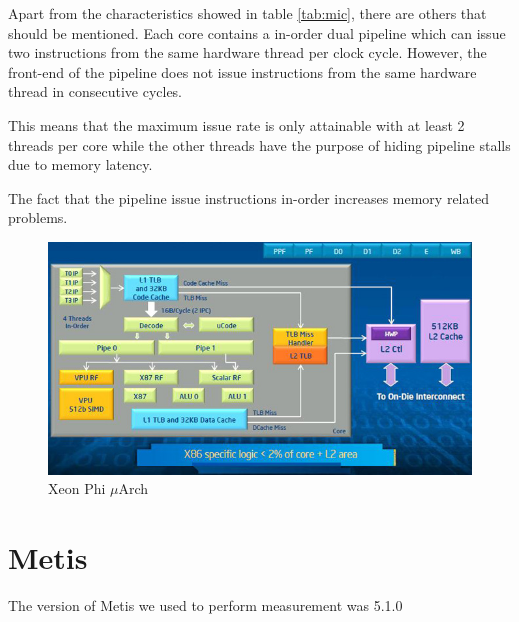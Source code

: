 \documentclass[abstract=on,9pt,twocolumn]{scrartcl}
\begin{document}
Apart from the characteristics showed in table \ref{tab:mic}, there are
others that should be mentioned. Each core contains a in-order dual
pipeline which can issue two instructions from the same hardware thread
per clock cycle. However, the front-end of the pipeline does not issue
instructions from the same hardware thread in consecutive cycles.\cite{Cepeda:PhiPerformance}

This means that the maximum issue rate is only attainable with at least
2 threads per core while the other threads have the purpose of hiding
pipeline stalls due to memory latency. %

The fact that the pipeline issue instructions in-order increases
memory related problems. %

\begin{center}
\begin{figure}[htb]
    \includegraphics[width=\columnwidth]{img/phi_arch.jpg}
    \caption{Xeon Phi $\mu$Arch}
    \label{img:phi_arch}
\end{figure}
\end{center}



\section{Metis}
\label{sec:metis}

The version of Metis we used to perform measurement was 5.1.0

\end{document}
